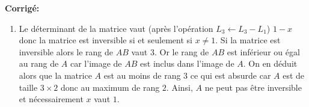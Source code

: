 \documentclass[a4paper,twoside,french,10pt]{VcCours}
\newcommand{\corr}{\textbf{Corrigé:}}
\begin{document}
\corr 
\begin{enumerate}
\item Le déterminant de la matrice vaut (après l'opération $L_3 \leftarrow L_3- L_1$) $1-x$ donc la matrice est inversible si et seulement si $x \neq 1$. Si la matrice est inversible alors le rang de $AB$ vaut $3$. Or le rang de $AB$ est inférieur ou égal au rang de $A$ car l'image de $AB$ est inclus dans l'image de $A$. On en déduit alors que la matrice $A$ est au moins de rang $3$ ce qui est absurde car $A$ est de taille $3 \times 2$ donc au maximum de rang $2$. Ainsi, $A$ ne peut pas être inversible et nécessairement $x$ vaut $1$.


\end{enumerate}
\end{document}
